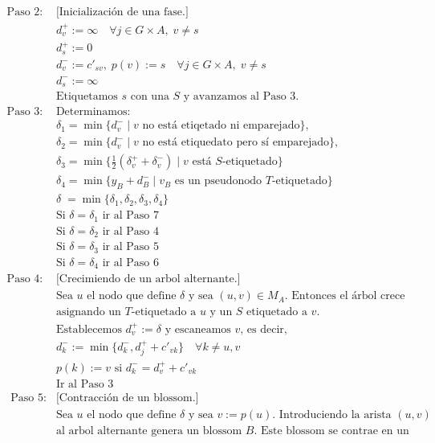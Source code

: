 \documentclass[twoside,a4paper,openright,12pt]{book}
\begin{document}
\begin{align*}
\text{Paso 2: }& \text{[Inicialización de una fase.]}\\
&d_v^+ := \infty \quad \forall j\in G\times A,\; v\neq s\\
&d_s^+:=0\\
&d_v^-:=c'_{sv},\;p(v):=s\quad \forall j\in G\times A,\; v\neq s\\
&d^-_s:=\infty\\
&\text{Etiquetamos $s$ con una $S$ y avanzamos al Paso 3.}\\
\text{Paso 3: }& \text{Determinamos:}\\
&\delta_1 = \min\{d_v^-\mid \text{$v$ no está etiqetado ni emparejado}\},\\
&\delta_2 =\min\{d_v^-\mid \text{$v$ no está etiquedato pero sí emparejado}\},\\
&\delta_3 =\min\{\frac{1}{2}(\delta_v^+ + \delta_v^-)\mid \text{$v$ está $S$-etiquetado}\}\\
&\delta_4 =\min\{y_B+d_B^- \mid \text{$v_B$ es un pseudonodo $T$-etiquetado}\}\\
&\delta\;= \min\{\delta_1,\delta_2,\delta_3,\delta_4\}\\
&\text{Si $\delta=\delta_1$ ir al Paso 7}\\
&\text{Si $\delta=\delta_2$ ir al Paso 4}\\
&\text{Si $\delta=\delta_3$ ir al Paso 5}\\
&\text{Si $\delta=\delta_4$ ir al Paso 6}\\
\text{Paso 4: }&\text{[Crecimiendo de un arbol alternante.]}\\
&\text{Sea $u$ el nodo que define $\delta$ y sea $(u,v)\in M_A$. Entonces el árbol crece}\\
&\text{asignando un $T$-etiquetado a $u$ y un $S$ etiquetado a $v$.}\\
&\text{Establecemos $d^+_v:=\delta$ y escaneamos $v$, es decir,}\\
&d^-_k:= \min\{d_k^-,d_j^++c'_{vk}\}\quad \forall k\neq u,v\\
&p(k):=v \text{ si } d_k^-= d_v^++c'_{vk}\\
&\text{Ir al Paso 3}\\
\text{ Paso 5: }&\text{[Contracción de un blossom.]}\\
&\text{Sea $u$ el nodo que define $\delta$ y sea $v:=p(u)$. Introduciendo la arista $(u,v)$}\\
&\text{al arbol alternante genera un blossom $B$. Este blossom se contrae en un}\\

\end{align*}
\end{document}
